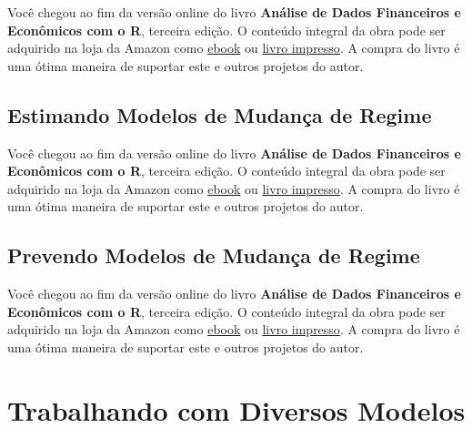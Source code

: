 \documentclass[
  11pt,
]{book}
\newenvironment{pleasebuyit}
{\begin{noteblock}
		
	} {\end{noteblock}}
\begin{document}
\begin{pleasebuyit}
Você chegou ao fim da versão online do livro \textbf{Análise de Dados
Financeiros e Econômicos com o R}, terceira edição. O conteúdo integral
da obra pode ser adquirido na loja da Amazon como
\href{https://www.amazon.com.br/dp/B08WNC27ZY}{ebook} ou
\href{https://www.amazon.com/dp/B08WP8CCDB}{livro impresso}. A compra do
livro é uma ótima maneira de suportar este e outros projetos do autor.
\end{pleasebuyit}

\hypertarget{estimando-modelos-de-mudanuxe7a-de-regime}{%
\subsection{Estimando Modelos de Mudança de Regime}\label{estimando-modelos-de-mudanuxe7a-de-regime}}

\begin{pleasebuyit}
Você chegou ao fim da versão online do livro \textbf{Análise de Dados
Financeiros e Econômicos com o R}, terceira edição. O conteúdo integral
da obra pode ser adquirido na loja da Amazon como
\href{https://www.amazon.com.br/dp/B08WNC27ZY}{ebook} ou
\href{https://www.amazon.com/dp/B08WP8CCDB}{livro impresso}. A compra do
livro é uma ótima maneira de suportar este e outros projetos do autor.
\end{pleasebuyit}

\hypertarget{prevendo-modelos-de-mudanuxe7a-de-regime}{%
\subsection{Prevendo Modelos de Mudança de Regime}\label{prevendo-modelos-de-mudanuxe7a-de-regime}}

\begin{pleasebuyit}
Você chegou ao fim da versão online do livro \textbf{Análise de Dados
Financeiros e Econômicos com o R}, terceira edição. O conteúdo integral
da obra pode ser adquirido na loja da Amazon como
\href{https://www.amazon.com.br/dp/B08WNC27ZY}{ebook} ou
\href{https://www.amazon.com/dp/B08WP8CCDB}{livro impresso}. A compra do
livro é uma ótima maneira de suportar este e outros projetos do autor.
\end{pleasebuyit}

\hypertarget{trabalhando-com-diversos-modelos}{%
\section{Trabalhando com Diversos Modelos}\label{trabalhando-com-diversos-modelos}}
\end{document}
